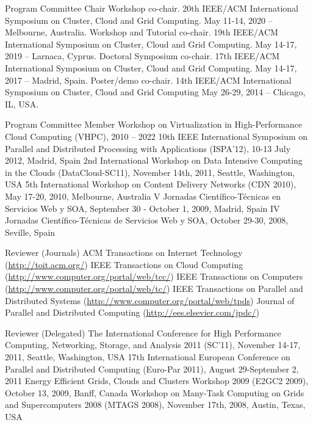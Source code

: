 \documentclass{resume}
\begin{document}
\begin{category}{Program Committee Chair}
\citembullet Workshop co-chair. 20th IEEE/ACM International Symposium on Cluster, Cloud and Grid Computing. May 11-14, 2020 -- Melbourne, Australia.
\citembullet Workshop and Tutorial co-chair. 19th IEEE/ACM International Symposium on Cluster, Cloud and Grid Computing. May 14-17, 2019 -- Larnaca, Cyprus.
\citembullet Doctoral Symposium co-chair. 17th IEEE/ACM International Symposium on Cluster, Cloud and Grid Computing. May 14-17, 2017 -- Madrid, Spain.
\citembullet Poster/demo co-chair. 14th IEEE/ACM International Symposium on Cluster, Cloud and Grid Computing
May 26-29, 2014 -- Chicago, IL, USA.
\end{category}

\begin{category}{Program Committee Member}
\citembullet Workshop on Virtualization in High-Performance Cloud Computing (VHPC), 2010 -- 2022
\citembullet 10th IEEE International Symposium on Parallel and Distributed Processing with Applications (ISPA'12), 10-13 July 2012, Madrid, Spain 
\citembullet 2nd International Workshop on Data Intensive Computing in the Clouds (DataCloud-SC11), November 14th, 2011, Seattle, Washington, USA
\citembullet 5th International Workshop on Content Delivery Networks (CDN 2010), May 17-20, 2010, Melbourne, Australia
\citembullet V Jornadas Científico-Técnicas en Servicios Web y SOA, September 30 - October 1, 2009, Madrid, Spain
\citembullet IV Jornadas Científico-Técnicas de Servicios Web y SOA, October 29-30, 2008, Seville, Spain
\end{category}

\begin{category}{Reviewer (Journals)}
\citembullet ACM Transactions on Internet Technology (\url{http://toit.acm.org/})
\citembullet IEEE Transactions on Cloud Computing (\url{http://www.computer.org/portal/web/tcc/})
\citembullet IEEE Transactions on Computers (\url{http://www.computer.org/portal/web/tc/})
\citembullet IEEE Transactions on Parallel and Distributed Systems (\url{http://www.computer.org/portal/web/tpds})
\citembullet Journal of Parallel and Distributed Computing (\url{http://ees.elsevier.com/jpdc/})
\end{category}

\begin{category}{Reviewer (Delegated)}
\citembullet The International Conference for High Performance Computing, Networking, Storage, and Analysis 2011 (SC'11), November 14-17, 2011, Seattle, Washington, USA
\citembullet 17th International European Conference on Parallel and Distributed Computing (Euro-Par 2011), August 29-September 2, 2011 
\citembullet Energy Efficient Grids, Clouds and Clusters Workshop 2009 (E2GC2 2009), October 13, 2009, Banff, Canada 
\citembullet Workshop on Many-Task Computing on Grids and Supercomputers 2008 (MTAGS 2008), November 17th, 2008, Austin, Texas, USA
\end{category}
\end{document}
